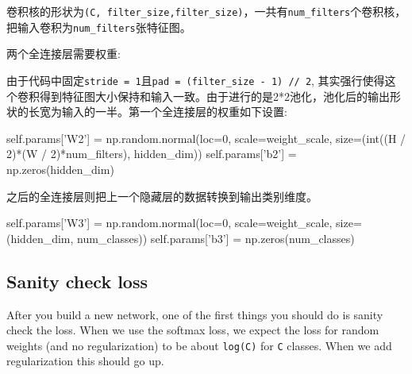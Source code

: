 \documentclass[11pt]{article}
\newenvironment{Shaded}{}{}
\newcommand{\DecValTok}[1]{\textcolor[rgb]{0.25,0.63,0.44}{{#1}}}
\newcommand{\StringTok}[1]{\textcolor[rgb]{0.25,0.44,0.63}{{#1}}}
\newcommand{\NormalTok}[1]{{#1}}
\newcommand{\VariableTok}[1]{\textcolor[rgb]{0.10,0.09,0.49}{{#1}}}
\newcommand{\OperatorTok}[1]{\textcolor[rgb]{0.40,0.40,0.40}{{#1}}}
\newcommand{\BuiltInTok}[1]{{#1}}
\begin{document}
卷积核的形状为\texttt{(C,\ filter\_size,filter\_size)}，一共有\texttt{num\_filters}个卷积核，把输入卷积为\texttt{num\_filters}张特征图。

两个全连接层需要权重:

由于代码中固定\texttt{stride\ =\ 1}且\texttt{pad\ =\ (filter\_size\ -\ 1)\ //\ 2},
其实强行使得这个卷积得到特征图大小保持和输入一致。由于进行的是2*2池化，池化后的输出形状的长宽为输入的一半。第一个全连接层的权重如下设置:

\begin{Shaded}
\begin{Highlighting}[]
\VariableTok{self}\NormalTok{.params[}\StringTok{'W2'}\NormalTok{] }\OperatorTok{=}\NormalTok{ np.random.normal(loc}\OperatorTok{=}\DecValTok{0}\NormalTok{, scale}\OperatorTok{=}\NormalTok{weight_scale, size}\OperatorTok{=}\NormalTok{(}\BuiltInTok{int}\NormalTok{((H }\OperatorTok{/} \DecValTok{2}\NormalTok{)}\OperatorTok{*}\NormalTok{(W }\OperatorTok{/} \DecValTok{2}\NormalTok{)}\OperatorTok{*}\NormalTok{num_filters), hidden_dim))}
\VariableTok{self}\NormalTok{.params[}\StringTok{'b2'}\NormalTok{] }\OperatorTok{=}\NormalTok{ np.zeros(hidden_dim)}
\end{Highlighting}
\end{Shaded}

 之后的全连接层则把上一个隐藏层的数据转换到输出类别维度。

\begin{Shaded}
\begin{Highlighting}[]
\VariableTok{self}\NormalTok{.params[}\StringTok{'W3'}\NormalTok{] }\OperatorTok{=}\NormalTok{ np.random.normal(loc}\OperatorTok{=}\DecValTok{0}\NormalTok{, scale}\OperatorTok{=}\NormalTok{weight_scale, size}\OperatorTok{=}\NormalTok{(hidden_dim, num_classes))}
\VariableTok{self}\NormalTok{.params[}\StringTok{'b3'}\NormalTok{] }\OperatorTok{=}\NormalTok{ np.zeros(num_classes)}
\end{Highlighting}
\end{Shaded}

    \hypertarget{sanity-check-loss}{%
\subsection{Sanity check loss}\label{sanity-check-loss}}

After you build a new network, one of the first things you should do is
sanity check the loss. When we use the softmax loss, we expect the loss
for random weights (and no regularization) to be about \texttt{log(C)}
for \texttt{C} classes. When we add regularization this should go up.
\end{document}
